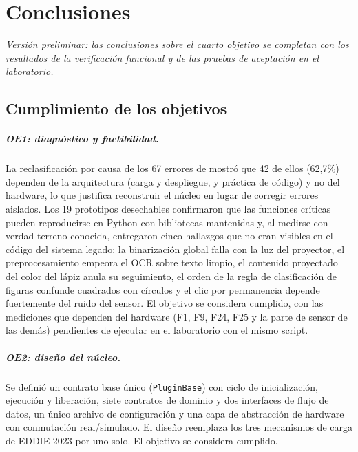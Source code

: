 \chapter{Conclusiones}
\label{cap:conclusiones}

\textit{Versión preliminar: las conclusiones sobre el cuarto objetivo se completan con los resultados de la verificación funcional y de las pruebas de aceptación en el laboratorio.}

\section{Cumplimiento de los objetivos}

\paragraph{OE1: diagnóstico y factibilidad.} La reclasificación por causa de los 67 errores de \citet{ibaceta2023evaluacion} mostró que 42 de ellos (62,7\%) dependen de la arquitectura (carga y despliegue, y práctica de código) y no del hardware, lo que justifica reconstruir el núcleo en lugar de corregir errores aislados. Los 19 prototipos desechables confirmaron que las funciones críticas pueden reproducirse en Python con bibliotecas mantenidas y, al medirse con verdad terreno conocida, entregaron cinco hallazgos que no eran visibles en el código del sistema legado: la binarización global falla con la luz del proyector, el preprocesamiento empeora el OCR sobre texto limpio, el contenido proyectado del color del lápiz anula su seguimiento, el orden de la regla de clasificación de figuras confunde cuadrados con círculos y el clic por permanencia depende fuertemente del ruido del sensor. El objetivo se considera cumplido, con las mediciones que dependen del hardware (F1, F9, F24, F25 y la parte de sensor de las demás) pendientes de ejecutar en el laboratorio con el mismo script.

\paragraph{OE2: diseño del núcleo.} Se definió un contrato base único (\texttt{PluginBase}) con ciclo de inicialización, ejecución y liberación, siete contratos de dominio y dos interfaces de flujo de datos, un único archivo de configuración y una capa de abstracción de hardware con conmutación real/simulado. El diseño reemplaza los tres mecanismos de carga de EDDIE-2023 por uno solo. El objetivo se considera cumplido.

